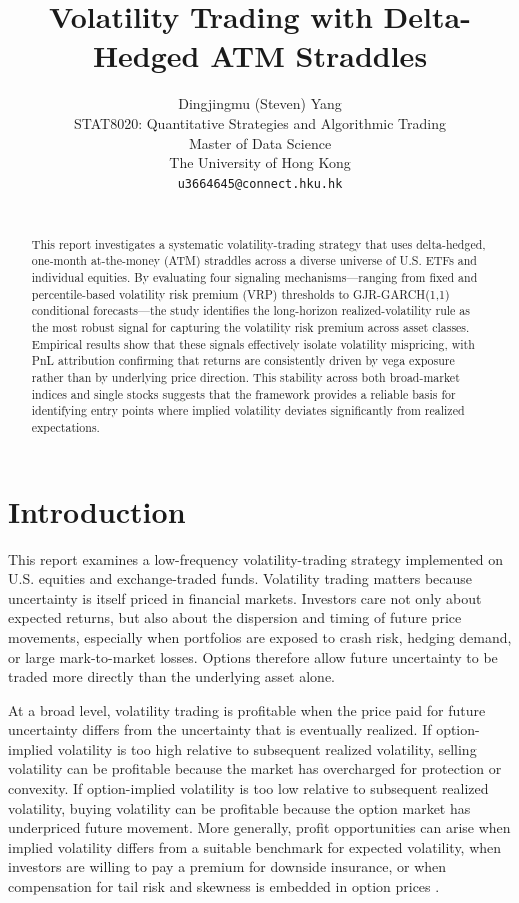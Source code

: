 ﻿\documentclass{article}
\title{Volatility Trading with Delta-Hedged ATM Straddles}
\date{}
\author{%
  Dingjingmu (Steven) Yang \\
  STAT8020: Quantitative Strategies and Algorithmic Trading\\
  Master of Data Science\\
  The University of Hong Kong\\
  \texttt{u3664645@connect.hku.hk} \\
  \href{https://github.com/StevenYang23/Volatility-based_Quant_Strategy}{\faGithub}\\
}
\begin{document}
\maketitle

\begin{abstract}
This report investigates a systematic volatility-trading strategy that uses delta-hedged, one-month at-the-money (ATM) straddles across a diverse universe of U.S. ETFs and individual equities. By evaluating four signaling mechanisms—ranging from fixed and percentile-based volatility risk premium (VRP) thresholds to GJR-GARCH(1,1) conditional forecasts—the study identifies the long-horizon realized-volatility rule as the most robust signal for capturing the volatility risk premium across asset classes. Empirical results show that these signals effectively isolate volatility mispricing, with PnL attribution confirming that returns are consistently driven by vega exposure rather than by underlying price direction. This stability across both broad-market indices and single stocks suggests that the framework provides a reliable basis for identifying entry points where implied volatility deviates significantly from realized expectations.
\end{abstract}

\clearpage

\section{Introduction}
\label{sec:intro}

This report examines a low-frequency volatility-trading strategy implemented on U.S. equities and exchange-traded funds. Volatility trading matters because uncertainty is itself priced in financial markets. Investors care not only about expected returns, but also about the dispersion and timing of future price movements, especially when portfolios are exposed to crash risk, hedging demand, or large mark-to-market losses. Options therefore allow future uncertainty to be traded more directly than the underlying asset alone.

At a broad level, volatility trading is profitable when the price paid for future uncertainty differs from the uncertainty that is eventually realized. If option-implied volatility is too high relative to subsequent realized volatility, selling volatility can be profitable because the market has overcharged for protection or convexity. If option-implied volatility is too low relative to subsequent realized volatility, buying volatility can be profitable because the option market has underpriced future movement. More generally, profit opportunities can arise when implied volatility differs from a suitable benchmark for expected volatility, when investors are willing to pay a premium for downside insurance, or when compensation for tail risk and skewness is embedded in option prices \cite{wu2009,bakas2018}.
\end{document}
